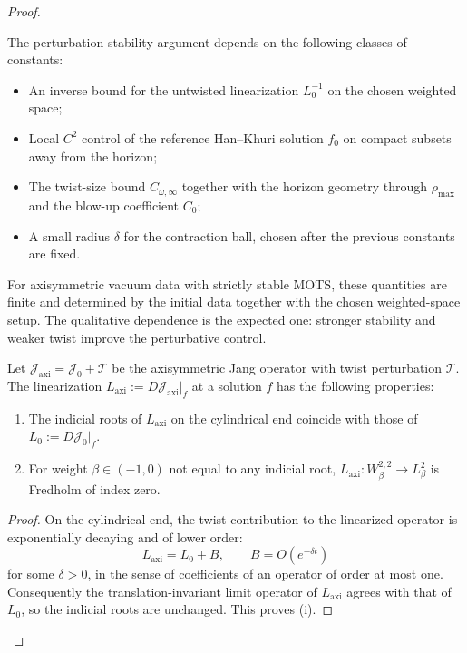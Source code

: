 \begin{proof}
\begin{remark}\label{rem:explicit-constants}
The perturbation stability argument depends on the following classes of constants:
\begin{itemize}
    \item An inverse bound for the untwisted linearization $L_0^{-1}$ on the chosen weighted space;
    \item Local $C^2$ control of the reference Han--Khuri solution $f_0$ on compact subsets away from the horizon;
    \item The twist-size bound $C_{\omega,\infty}$ together with the horizon geometry through $\rho_{\max}$ and the blow-up coefficient $C_0$;
    \item A small radius $\delta$ for the contraction ball, chosen after the previous constants are fixed.
\end{itemize}
For axisymmetric vacuum data with strictly stable MOTS, these quantities are finite and determined by the initial data together with the chosen weighted-space setup. The qualitative dependence is the expected one: stronger stability and weaker twist improve the perturbative control.
\end{remark}

\begin{lemma}\label{lem:twisted-indicial}\label{lem:fredholm}
Let $\mathcal{J}_{\mathrm{axi}} = \mathcal{J}_0 + \mathcal{T}$ be the axisymmetric Jang operator with twist perturbation $\mathcal{T}$. The linearization $L_{\mathrm{axi}} := D\mathcal{J}_{\mathrm{axi}}|_f$ at a solution $f$ has the following properties:
\begin{enumerate}
    \item[(i)] The indicial roots of $L_{\mathrm{axi}}$ on the cylindrical end coincide with those of $L_0 := D\mathcal{J}_0|_f$.
    \item[(ii)] For weight $\beta \in (-1, 0)$ not equal to any indicial root, $L_{\mathrm{axi}}: W^{2,2}_\beta \to L^2_\beta$ is Fredholm of index zero.
\end{enumerate}
\end{lemma}

\begin{proof}
On the cylindrical end, the twist contribution to the linearized operator is exponentially decaying and of lower order:
\[
L_{\mathrm{axi}} = L_0 + B,
\qquad
B = O(e^{-\delta t})
\]
for some $\delta>0$, in the sense of coefficients of an operator of order at most one. Consequently the translation-invariant limit operator of $L_{\mathrm{axi}}$ agrees with that of $L_0$, so the indicial roots are unchanged. This proves (i).


\end{proof}
\end{proof}
